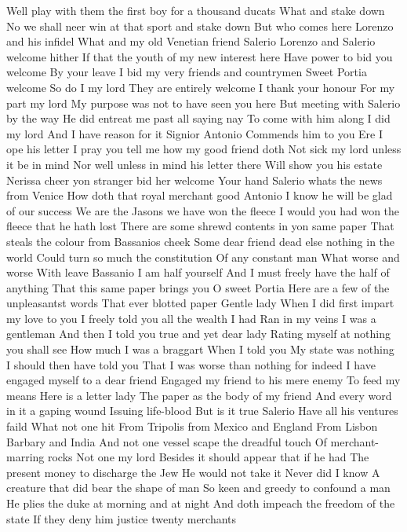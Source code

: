 Well play with them the first boy for a thousand ducats
What and stake down
No we shall neer win at that sport and stake down
But who comes here Lorenzo and his infidel What
and my old Venetian friend Salerio
Lorenzo and Salerio welcome hither
If that the youth of my new interest here
Have power to bid you welcome By your leave
I bid my very friends and countrymen
Sweet Portia welcome
So do I my lord
They are entirely welcome
I thank your honour For my part my lord
My purpose was not to have seen you here
But meeting with Salerio by the way
He did entreat me past all saying nay
To come with him along
I did my lord
And I have reason for it Signior Antonio
Commends him to you
Ere I ope his letter
I pray you tell me how my good friend doth
Not sick my lord unless it be in mind
Nor well unless in mind his letter there
Will show you his estate
Nerissa cheer yon stranger bid her welcome
Your hand Salerio whats the news from Venice
How doth that royal merchant good Antonio
I know he will be glad of our success
We are the Jasons we have won the fleece
I would you had won the fleece that he hath lost
There are some shrewd contents in yon same paper
That steals the colour from Bassanios cheek
Some dear friend dead else nothing in the world
Could turn so much the constitution
Of any constant man What worse and worse
With leave Bassanio I am half yourself
And I must freely have the half of anything
That this same paper brings you
O sweet Portia
Here are a few of the unpleasantst words
That ever blotted paper Gentle lady
When I did first impart my love to you
I freely told you all the wealth I had
Ran in my veins I was a gentleman
And then I told you true and yet dear lady
Rating myself at nothing you shall see
How much I was a braggart When I told you
My state was nothing I should then have told you
That I was worse than nothing for indeed
I have engaged myself to a dear friend
Engaged my friend to his mere enemy
To feed my means Here is a letter lady
The paper as the body of my friend
And every word in it a gaping wound
Issuing life-blood But is it true Salerio
Have all his ventures faild What not one hit
From Tripolis from Mexico and England
From Lisbon Barbary and India
And not one vessel scape the dreadful touch
Of merchant-marring rocks
Not one my lord
Besides it should appear that if he had
The present money to discharge the Jew
He would not take it Never did I know
A creature that did bear the shape of man
So keen and greedy to confound a man
He plies the duke at morning and at night
And doth impeach the freedom of the state
If they deny him justice twenty merchants
